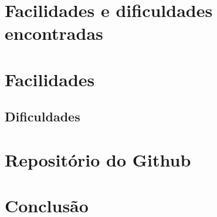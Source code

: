\documentclass[ ]{article}
\begin{document}
	\section{Facilidades e dificuldades encontradas}
		\section{Facilidades}
		\subsection{Dificuldades}
	\section{Repositório do Github}
	\section{Conclusão}
	
\end{document}
